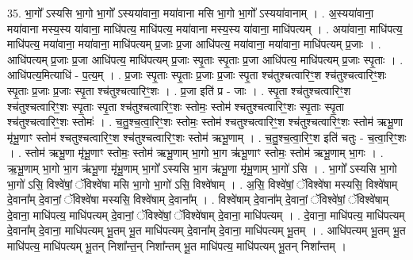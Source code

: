 \documentclass[17pt]{extarticle}
\begin{document}
35. भा॒गो᳚ ऽस्यसि भा॒गो भा॒गो᳚ ऽस्यया॑वाना॒ मया॑वाना मसि भा॒गो भा॒गो᳚ ऽस्यया॑वानाम् । . अ॒स्यया॑वाना॒ मया॑वाना मस्य॒स्य या॑वाना॒ माधि॑पत्य॒ माधि॑पत्य॒ मया॑वाना मस्य॒स्य या॑वाना॒ माधि॑पत्यम् । . अया॑वाना॒ माधि॑पत्य॒ माधि॑पत्य॒ मया॑वाना॒ मया॑वाना॒ माधि॑पत्यम् प्र॒जाः प्र॒जा आधि॑पत्य॒ मया॑वाना॒ मया॑वाना॒ माधि॑पत्यम् प्र॒जाः । . आधि॑पत्यम् प्र॒जाः प्र॒जा आधि॑पत्य॒ माधि॑पत्यम् प्र॒जाः स्पृ॒ताः स्पृ॒ताः प्र॒जा आधि॑पत्य॒ माधि॑पत्यम् प्र॒जाः स्पृ॒ताः । . आधि॑पत्य॒मित्याधि॑ - प॒त्य॒म् । . प्र॒जाः स्पृ॒ताः स्पृ॒ताः प्र॒जाः प्र॒जाः स्पृ॒ता श्च॑तुश्चत्वारिꣳ॒॒श श्च॑तुश्चत्वारिꣳ॒॒शः स्पृ॒ताः प्र॒जाः प्र॒जाः स्पृ॒ता श्च॑तुश्चत्वारिꣳ॒॒शः । . प्र॒जा इति॑ प्र - जाः । . स्पृ॒ता श्च॑तुश्चत्वारिꣳ॒॒श श्च॑तुश्चत्वारिꣳ॒॒शः स्पृ॒ताः स्पृ॒ता श्च॑तुश्चत्वारिꣳ॒॒शः स्तोमः॒ स्तोम॑ श्चतुश्चत्वारिꣳ॒॒शः स्पृ॒ताः स्पृ॒ता श्च॑तुश्चत्वारिꣳ॒॒शः स्तोमः॑ । . च॒तु॒श्च॒त्वा॒रिꣳ॒॒शः स्तोमः॒ स्तोम॑ श्चतुश्चत्वारिꣳ॒॒श श्च॑तुश्चत्वारिꣳ॒॒शः स्तोम॑ ऋभू॒णा मृ॑भू॒णाꣳ स्तोम॑ श्चतुश्चत्वारिꣳ॒॒श श्च॑तुश्चत्वारिꣳ॒॒शः स्तोम॑ ऋभू॒णाम् । . च॒तु॒श्च॒त्वा॒रिꣳ॒॒श इति॑ चतुः - च॒त्वा॒रिꣳ॒॒शः । . स्तोम॑ ऋभू॒णा मृ॑भू॒णाꣳ स्तोमः॒ स्तोम॑ ऋभू॒णाम् भा॒गो भा॒ग ऋ॑भू॒णाꣳ स्तोमः॒ स्तोम॑ ऋभू॒णाम् भा॒गः । . ऋ॒भू॒णाम् भा॒गो भा॒ग ऋ॑भू॒णा मृ॑भू॒णाम् भा॒गो᳚ ऽस्यसि भा॒ग ऋ॑भू॒णा मृ॑भू॒णाम् भा॒गो॑ ऽसि । . भा॒गो᳚ ऽस्यसि भा॒गो भा॒गो॑ ऽसि॒ विश्वे॑षां॒ ॅविश्वे॑षा मसि भा॒गो भा॒गो॑ ऽसि॒ विश्वे॑षाम् । . अ॒सि॒ विश्वे॑षां॒ ॅविश्वे॑षा मस्यसि॒ विश्वे॑षाम् दे॒वाना᳚म् दे॒वानां॒ ॅविश्वे॑षा मस्यसि॒ विश्वे॑षाम् दे॒वाना᳚म् । . विश्वे॑षाम् दे॒वाना᳚म् दे॒वानां॒ ॅविश्वे॑षां॒ ॅविश्वे॑षाम् दे॒वाना॒ माधि॑पत्य॒ माधि॑पत्यम् दे॒वानां॒ ॅविश्वे॑षां॒ ॅविश्वे॑षाम् दे॒वाना॒ माधि॑पत्यम् । . दे॒वाना॒ माधि॑पत्य॒ माधि॑पत्यम् दे॒वाना᳚म् दे॒वाना॒ माधि॑पत्यम् भू॒तम् भू॒त माधि॑पत्यम् दे॒वाना᳚म् दे॒वाना॒ माधि॑पत्यम् भू॒तम् । . आधि॑पत्यम् भू॒तम् भू॒त माधि॑पत्य॒ माधि॑पत्यम् भू॒तन् निशा᳚न्त॒न् निशा᳚न्तम् भू॒त माधि॑पत्य॒ माधि॑पत्यम् भू॒तन् निशा᳚न्तम् । \newline
\end{document}
